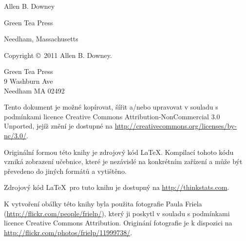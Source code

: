\documentclass[12pt]{book}
\begin{document}
\begin{latexonly}
\begin{flushright}
{\Large
Allen B. Downey\\
}


\vspace{0.5in}

{\Large Green Tea Press}

{\small Needham, Massachusetts}

\vfill

\end{flushright}


\pagebreak
\thispagestyle{empty}

{\small
Copyright \copyright ~2011 Allen B. Downey.


\vspace{0.2in}

\begin{flushleft}
Green Tea Press       \\
9 Washburn Ave \\
Needham MA 02492
\end{flushleft}

Tento dokument je možné kopírovat, šířit a/nebo upravovat v souladu s podmínkami licence Creative Commons Attribution-NonCommercial 3.0 Unported, jejíž znění je dostupné na \url{http://creativecommons.org/licenses/by-nc/3.0/}.

Originální formou této knihy je zdrojový kód \LaTeX. Kompilací tohoto kódu vzniká zobrazení učebnice, které je nezávislé na konkrétním zařízení a může být převedeno do jiných formátů a vytištěno.


Zdrojový kód \LaTeX\ pro tuto knihu je dostupný na
\url{http://thinkstats.com}.

K vytvoření obálky této knihy byla použita fotografie Paula Friela
(\url{http://flickr.com/people/frielp/}), který ji poskytl v souladu s podmínkami licence Creative Commons Attribution.
Originání fotografie je k dispozici na \url{http://flickr.com/photos/frielp/11999738/}.

\vspace{0.2in}

} %

\end{latexonly}


\end{document}
